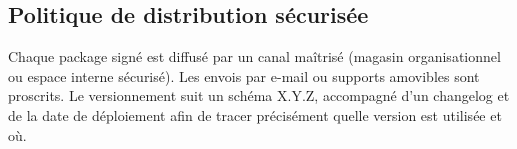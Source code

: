 \subsection{Politique de distribution sécurisée}
Chaque package signé est diffusé par un canal maîtrisé (magasin organisationnel ou espace interne sécurisé). Les envois par e-mail ou supports amovibles sont proscrits. Le versionnement suit un schéma X.Y.Z, accompagné d’un changelog et de la date de déploiement afin de tracer précisément quelle version est utilisée et où.
